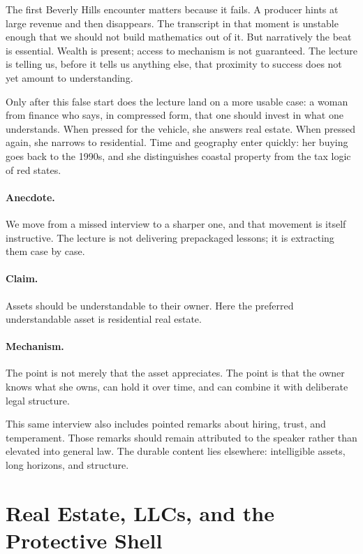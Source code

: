 The first Beverly Hills encounter matters because it fails. A producer hints at large revenue and then disappears. The transcript in that moment is unstable enough that we should not build mathematics out of it. But narratively the beat is essential. Wealth is present; access to mechanism is not guaranteed. The lecture is telling us, before it tells us anything else, that proximity to success does not yet amount to understanding.

Only after this false start does the lecture land on a more usable case: a woman from finance who says, in compressed form, that one should invest in what one understands. When pressed for the vehicle, she answers real estate. When pressed again, she narrows to residential. Time and geography enter quickly: her buying goes back to the 1990s, and she distinguishes coastal property from the tax logic of red states.

\paragraph{Anecdote.} We move from a missed interview to a sharper one, and that movement is itself instructive. The lecture is not delivering prepackaged lessons; it is extracting them case by case.

\paragraph{Claim.} Assets should be understandable to their owner. Here the preferred understandable asset is residential real estate.

\paragraph{Mechanism.} The point is not merely that the asset appreciates. The point is that the owner knows what she owns, can hold it over time, and can combine it with deliberate legal structure.

This same interview also includes pointed remarks about hiring, trust, and temperament. Those remarks should remain attributed to the speaker rather than elevated into general law. The durable content lies elsewhere: intelligible assets, long horizons, and structure.

\section{Real Estate, LLCs, and the Protective Shell}

